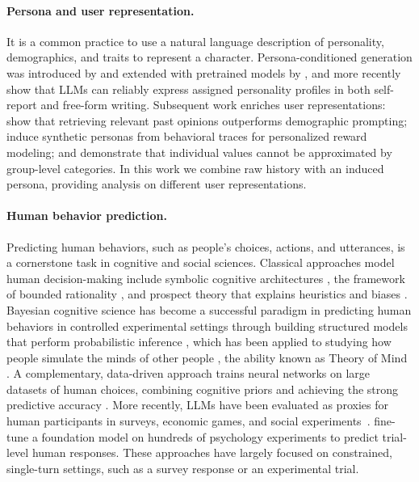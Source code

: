 \documentclass{article} %
\begin{document}
\paragraph{Persona and user representation.}
It is a common practice to use a natural language description of personality, demographics, and traits to represent a character. Persona-conditioned generation was introduced by \citet{zhang2018personalizing} and extended with pretrained models by \citet{wolf2019transfertransfo}, and \citet{jiang2024personallm} more recently show that LLMs can reliably express assigned personality profiles in both self-report and free-form writing. Subsequent work enriches user representations: \citet{hwang2023aligning} show that retrieving relevant past opinions outperforms demographic prompting; \citet{ryan2025synthesizeme} induce synthetic personas from behavioral traces for personalized reward modeling; and \citet{jiang2024indievalue} demonstrate that individual values cannot be approximated by group-level categories. In this work we combine raw history with an induced persona, providing analysis on different user representations.

\paragraph{Human behavior prediction.} Predicting human behaviors, such as people's choices, actions, and utterances, is a cornerstone task in cognitive and social sciences. Classical approaches model human decision-making include symbolic cognitive architectures \citep{newell1994unified, anderson2013adaptive}, the framework of bounded rationality \citep{simon1955behavioral}, and prospect theory that explains heuristics and biases \citep{kahneman2013prospect}. Bayesian cognitive science has become a successful paradigm in predicting human behaviors in controlled experimental settings through building structured models that perform probabilistic inference \citep{griffiths2024bayesian}, which has been applied to studying how people simulate the minds of other people \citep{baker2009action, baker2017rational}, the ability known as Theory of Mind \citep{frith2005theory}.
A complementary, data-driven approach trains neural networks on large datasets of human choices, combining cognitive priors and achieving the strong predictive accuracy \citep{bourgin2019cognitive, peterson2021using}. More recently, LLMs have been evaluated as proxies for human participants in surveys, economic games, and social experiments~\citep{argyle2023out, horton2023large, aher2023using, park2024generative}. \citet{binz2025foundation} fine-tune a foundation model on hundreds of psychology experiments to predict trial-level human responses. These approaches have largely focused on constrained, single-turn settings, such as a survey response or an experimental trial. 
\end{document}
